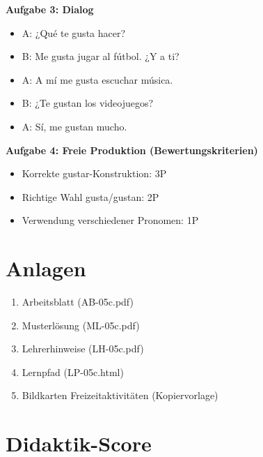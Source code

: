 \documentclass[11pt,a4paper]{article}
\begin{document}
\textbf{Aufgabe 3: Dialog}
\begin{itemize}
    \item A: ¿Qué te gusta hacer?
    \item B: Me gusta jugar al fútbol. ¿Y a ti?
    \item A: A mí me gusta escuchar música.
    \item B: ¿Te gustan los videojuegos?
    \item A: Sí, me gustan mucho.
\end{itemize}

\textbf{Aufgabe 4: Freie Produktion (Bewertungskriterien)}
\begin{itemize}
    \item Korrekte gustar-Konstruktion: 3P
    \item Richtige Wahl gusta/gustan: 2P
    \item Verwendung verschiedener Pronomen: 1P
\end{itemize}

\section{Anlagen}

\begin{enumerate}
    \item Arbeitsblatt (AB-05c.pdf)
    \item Musterlösung (ML-05c.pdf)
    \item Lehrerhinweise (LH-05c.pdf)
    \item Lernpfad (LP-05c.html)
    \item Bildkarten Freizeitaktivitäten (Kopiervorlage)
\end{enumerate}

\newpage
\section{Didaktik-Score}
\end{document}
